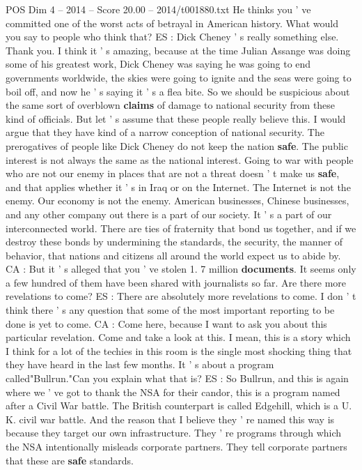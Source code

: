 \begin{textsample}{POS Dim 4 – 2014 – Score 20.00 – 2014/t001880.txt}
He thinks you ' ve committed one of the worst acts of betrayal in American history.
What would you say to people who think that?
ES : Dick Cheney ' s really something else.
Thank you.
I think it ' s amazing, because at the time Julian Assange was doing some of his greatest work, Dick Cheney was saying he was going to end governments worldwide, the skies were going to ignite and the seas were going to boil off, and now he ' s saying it ' s a flea bite.
So we should be suspicious about the same sort of overblown \textbf{claims} of damage to national security from these kind of officials.
But let ' s assume that these people really believe this.
I would argue that they have kind of a narrow conception of national security.
The prerogatives of people like Dick Cheney do not keep the nation \textbf{safe}.
The public interest is not always the same as the national interest.
Going to war with people who are not our enemy in places that are not a threat doesn ' t make us \textbf{safe}, and that applies whether it ' s in Iraq or on the Internet.
The Internet is not the enemy.
Our economy is not the enemy.
American businesses, Chinese businesses, and any other company out there is a part of our society.
It ' s a part of our interconnected world.
There are ties of fraternity that bond us together, and if we destroy these bonds by undermining the standards, the security, the manner of behavior, that nations and citizens all around the world expect us to abide by.
CA : But it ' s alleged that you ' ve stolen 1. 7 million \textbf{documents}.
It seems only a few hundred of them have been shared with journalists so far.
Are there more revelations to come?
ES : There are absolutely more revelations to come.
I don ' t think there ' s any question that some of the most important reporting to be done is yet to come.
CA : Come here, because I want to ask you about this particular revelation.
Come and take a look at this.
I mean, this is a story which I think for a lot of the techies in this room is the single most shocking thing that they have heard in the last few months.
It ' s about a program called"Bullrun."Can you explain what that is?
ES : So Bullrun, and this is again where we ' ve got to thank the NSA for their candor, this is a program named after a Civil War battle.
The British counterpart is called Edgehill, which is a U.
K. civil war battle.
And the reason that I believe they ' re named this way is because they target our own infrastructure.
They ' re programs through which the NSA intentionally misleads corporate partners.
They tell corporate partners that these are \textbf{safe} standards.

\end{textsample}
